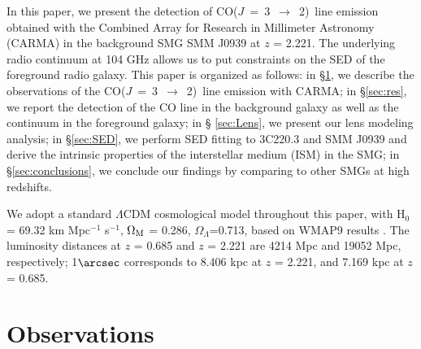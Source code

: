 \documentclass{emulateapj}
\newcommand{\CO}{\mbox{CO($J$ = 3 $\rightarrow$ 2) }}
\newcommand{\pmOne}{$^{-1}$}
\begin{document}
In this paper, we present the detection of \CO line emission obtained with the Combined
Array for Research in Millimeter Astronomy (CARMA) in the background SMG
SMM J0939 at $z$ = 2.221. The underlying radio continuum at 104 GHz allows us to put constraints on the SED of the 
foreground radio galaxy. This paper is organized as follows: in \S \ref{sec:obs}, we describe the
observations of the \CO line emission with CARMA; in \S \ref{sec:res}, we report the
detection of the CO line in the background galaxy as well as the continuum in the foreground galaxy; in \S
\ref{sec:Lens}, we present our lens modeling analysis; in \S \ref{sec:SED}, we perform SED fitting to 3C220.3
and SMM J0939 and derive the intrinsic properties of the interstellar medium (ISM) in the SMG; in \S \ref{sec:conclusions}, we
conclude our findings by comparing to other SMGs at high redshifts.

We adopt a standard $\Lambda$CDM cosmological model throughout this paper, with H$_0$= 69.32 km Mpc\pmOne
s\pmOne, $\Omega_{\rm M}$ = 0.286, $\Omega_\Lambda$=0.713, based on WMAP9 results \citep{Hinshaw13a}.
The luminosity distances at $z$ = 0.685 and $z$ = 2.221 are 4214 Mpc and 19052 Mpc, respectively; 1$\arcsec$
corresponds to 8.406 kpc at $z$ = 2.221, and 7.169 kpc at $z$ = 0.685.

\section{Observations}\label{sec:obs}
\end{document}
